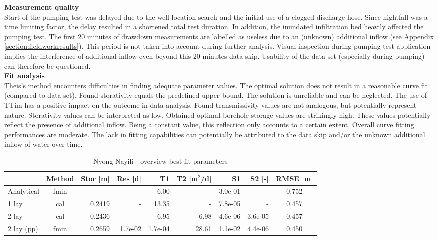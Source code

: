 \textbf{Measurement quality} \\
Start of the pumping test was delayed due to the well location search and the initial use of a clogged discharge hose. Since nightfall was a time limiting factor, the delay resulted in a shortened total test duration. In addition, the inundated infiltration bed heavily affected the pumping test. The first 20 minutes of drawdown measurements are labelled as useless due to an (unknown) additional inflow (see Appendix \ref{section:fieldworkresults}). This period is not taken into account during further analysis. Visual inspection during pumping test application implies the interference of additional inflow even beyond this 20 minutes data skip. Usability of the data set (especially during pumping) can therefore be questioned. \\
 
\textbf{Fit analysis} \\
Theis's method encounters difficulties in finding adequate parameter values. The optimal solution does not result in a reasonable curve fit (compared to data-set). Found storativity equals the predefined upper bound. The solution is unreliable and can be neglected. The use of TTim has a positive impact on the outcome in data analysis. Found transmissivity values are not analogous, but potentially represent nature. Storativity values can be interpreted as low. Obtained optimal borehole storage values are strikingly high. These values potentially reflect the presence of additional inflow. Being a constant value, this reflection only accounts to a certain extent. Overall curve fitting performances are moderate. The lack in fitting capabilities can potentially be attributed to the data skip and/or the unknown additional inflow of water over time. \\

\begin{table}[h!]
\small
\centering
\caption{Nyong Nayili - overview best fit parameters}
\label{tab:Nyong_Nayili_table}
\begin{tabular}{l|c|r|r|rr|rr|c}
\hline 
\textbf{}       & \textbf{Method} & \textbf{Stor [m]} & \textbf{Res [d]} & \textbf{T1}  & \textbf{T2   [m$^2$/d]}  & \textbf{S1}  & \textbf{S2 [-]}  & \textbf{RMSE [m]} \\ \hline \hline
Analytical                & fmin             & -             & -            & 6.00       & -          & 3.0e-01    & -          & 0.752 \\
1 lay                     & cal              & 0.2419        & -            & 13.35      & -          & 7.8e-05    & -          & 0.457 \\
2 lay                     & cal              & 0.2436        & -            & 6.95       & 6.98       & 4.6e-06    & 3.6e-05    & 0.457 \\
2 lay (pp)                & fmin             & 0.2659        & 1.7e-02      & 1.7e-04    & 28.61      & 1.1e-02    & 4.4e-06    & 0.450 \\ \hline    
\end{tabular}
\end{table}

